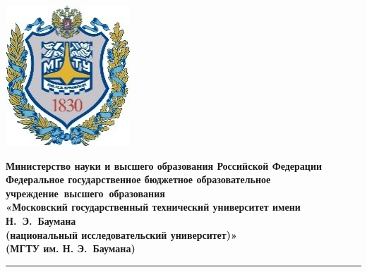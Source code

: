 \begin{titlepage}
	
	\noindent
	\begin{minipage}{0.15\textwidth}
		\includegraphics[width=\textwidth]{img/bmstu_logo.jpg}
	\end{minipage}
	\begin{minipage}{0.85\textwidth}
		\fontsize{10}{12}\selectfont
		\centering
		\textbf{Министерство науки и высшего образования Российской Федерации}\\
		\textbf{Федеральное государственное бюджетное образовательное учреждение~высшего~образования}\\
		\textbf{«Московский государственный технический университет имени\\Н.~Э.~Баумана}\\
		\textbf{(национальный исследовательский университет)»}\\
		\textbf{(МГТУ им. Н. Э.~Баумана)}
	\end{minipage}

	\noindent
	\rule{\textwidth}{3pt}

	\vspace{0.5cm}


\end{titlepage}
